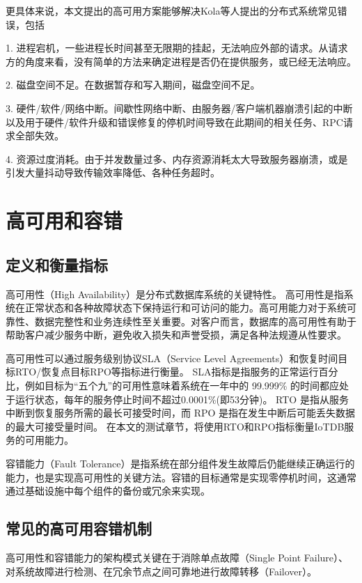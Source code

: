 更具体来说，本文提出的高可用方案能够解决Kola\cite{kola2005faults}等人提出的分布式系统常见错误，包括

1. 进程宕机，一些进程长时间甚至无限期的挂起，无法响应外部的请求。从请求方的角度来看，没有简单的方法来确定进程是否仍在提供服务，或已经无法响应。

2. 磁盘空间不足。在数据暂存和写入期间，磁盘空间不足。

3. 硬件/软件/网络中断。间歇性网络中断、由服务器/客户端机器崩溃引起的中断以及用于硬件/软件升级和错误修复的停机时间导致在此期间的相关任务、RPC请求全部失效。

4. 资源过度消耗。由于并发数量过多、内存资源消耗太大导致服务器崩溃，或是引发大量抖动导致传输效率降低、各种任务超时。


\section{高可用和容错}

\subsection{定义和衡量指标}

高可用性（High Availability）是分布式数据库系统的关键特性。
高可用性是指系统在正常状态和各种故障状态下保持运行和可访问的能力。高可用能力对于系统可靠性、数据完整性和业务连续性至关重要。对客户而言，数据库的高可用性有助于帮助客户减少服务中断，避免收入损失和声誉受损，满足各种法规遵从性要求。


高可用性可以通过服务级别协议SLA（Service Level Agreements）和恢复时间目标RTO/恢复点目标RPO等指标进行衡量。
SLA指标是指服务的正常运行百分比，例如目标为“五个九”的可用性意味着系统在一年中的 99.999\% 的时间都应处于运行状态，每年的服务停止时间不超过0.0001\%(即53分钟)。
RTO 是指从服务中断到恢复服务所需的最长可接受时间，而 RPO 是指在发生中断后可能丢失数据的最大可接受量时间。
在本文的测试章节，将使用RTO和RPO指标衡量IoTDB服务的可用能力。

容错能力（Fault Tolerance）是指系统在部分组件发生故障后仍能继续正确运行的能力\cite{lee1990fault}，也是实现高可用性的关键方法。容错的目标通常是实现零停机时间，这通常通过基础设施中每个组件的备份或冗余来实现。


\subsection{常见的高可用容错机制}

高可用性和容错能力的架构模式关键在于消除单点故障（Single Point Failure）、对系统故障进行检测、在冗余节点之间可靠地进行故障转移（Failover）。

